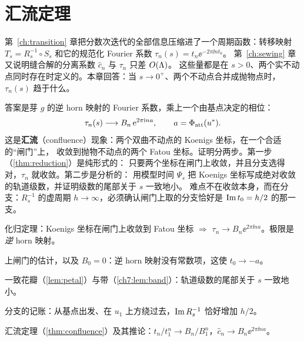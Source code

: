 \providecommand{\cfR}{\mathcal R}     %
\providecommand{\cfS}{\mathcal S}     %
\providecommand{\cfB}{\mathcal B}     %
\providecommand{\cfG}{\mathcal G}     %
\providecommand{\cfU}{\mathcal U}     %
\providecommand{\Arg}{\operatorname{Arg}}

\chapter{汇流定理}\label{ch:confluence}

第~\ref{ch:transition} 章把分数次迭代的全部信息压缩进了一个周期函数：转移映射
$T_s=R_s^{-1}\circ S_s$ 和它的规范化 Fourier 系数 $\tau_n(s)=t_n\ee^{-2\pi\ii nt_0}$。
第~\ref{ch:sewing} 章又说明缝合解的分离系数 $\hat c_n$ 与 $\tau_n$ 只差 $O(\Lambda)$。
这些量都是在 $s>0$、两个实不动点同时存在时定义的。本章回答：当 $s\to0^+$、两个不动点合并成抛物点时，
$\tau_n(s)$ 趋于什么。

答案是芽 $g$ 的逆 horn 映射的 Fourier 系数，乘上一个由基点决定的相位：
\[
 \tau_n(s)\longrightarrow B_n\,\mathrm{e}^{2\pi\mathrm{i} na},\qquad a=\Phi_{\mathrm{att}}(u^{*}).
\]
这是\textbf{汇流}（confluence）现象：两个双曲不动点的 Koenigs 坐标，在一个合适的``闸门''上，
收敛到抛物不动点的两个 Fatou 坐标。证明分两步。第一步（\cref{thm:reduction}）是纯形式的：
只要两个坐标在闸门上收敛，并且分支选得对，$\tau_n$ 就收敛。第二步是分析的：
用模型时间 $\Psi_s$ 把 Koenigs 坐标写成绝对收敛的轨道级数，并证明级数的尾部关于 $s$ 一致地小。
难点不在收敛本身，而在分支：$R_s^{-1}$ 的虚周期 $h\to\infty$，必须确认闸门上取的分支恰好是
$\operatorname{Im} t_0=h/2$ 的那一支。

\begin{goals}
\item 化归定理：Koenigs 坐标在闸门上收敛到 Fatou 坐标 $\Rightarrow$ $\tau_n\to B_n\ee^{2\pi\ii na}$。极限是\emph{逆} horn 映射。
\item 上闸门的估计，以及 $B_0=0$：逆 horn 映射没有常数项，这使 $t_0\to-a$。
\item 一致花瓣（\cref{lem:petal}）与带（\cref{ch7:lem:band}）：轨道级数的尾部关于 $s$ 一致地小。
\item 分支的记账：从基点出发、在 $u_1$ 上方绕过去，$\operatorname{Im} R_s^{-1}$ 恰好增加 $h/2$。
\item 汇流定理（\cref{thm:confluence}）及其推论：$t_n/t_1^n\to B_n/B_1^n$，$\hat c_n\to B_n\ee^{2\pi\ii na}$。
\end{goals}

